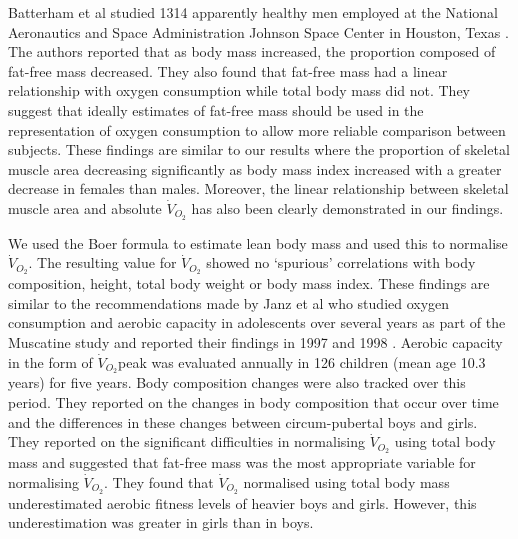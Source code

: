 Batterham et al studied 1314 apparently healthy men employed at the National Aeronautics and Space Administration Johnson Space Center in Houston, Texas \parencite{batterham_modeling_1999}. 
The authors reported that as body mass increased, the proportion composed of fat-free mass decreased. 
They also found that fat-free mass had a linear relationship with oxygen consumption while total body mass did not. 
They suggest that ideally estimates of fat-free mass should be used in the representation of oxygen consumption to allow more reliable comparison between subjects. 
These findings are similar to our results where the proportion of skeletal muscle area decreasing significantly as body mass index increased with a greater decrease in females than males. 
Moreover, the linear relationship between skeletal muscle area and absolute $\dot{V}_{O_2}$ has also been clearly demonstrated in our findings. 

We used the Boer formula \parencite{boer_estimated_1984}to estimate lean body mass and used this to normalise $\dot{V}_{O_2}$. 
The resulting value for $\dot{V}_{O_2}$ showed no `spurious' correlations with body composition, height, total body weight or body mass index. 
These findings are similar to the recommendations made by Janz et al who studied oxygen consumption and aerobic capacity in adolescents over several years as part of the Muscatine study and reported their findings in 1997\parencite{janz_three-year_1997} and 1998 \parencite{janz_longitudinal_1998}. 
Aerobic capacity in the form of $\dot{V}_{O_2}$peak was evaluated annually in 126 children (mean age 10.3 years) for five years. 
Body composition changes were also tracked over this period. 
They reported on the changes in body composition that occur over time and the differences in these changes between circum-pubertal boys and girls. 
They reported on the significant difficulties in normalising $\dot{V}_{O_2}$ using total body mass and suggested that fat-free mass was the most appropriate variable for normalising $\dot{V}_{O_2}$. 
They found that $\dot{V}_{O_2}$ normalised using total body mass underestimated aerobic fitness levels of heavier boys and girls. 
However, this underestimation was greater in girls than in boys. 

